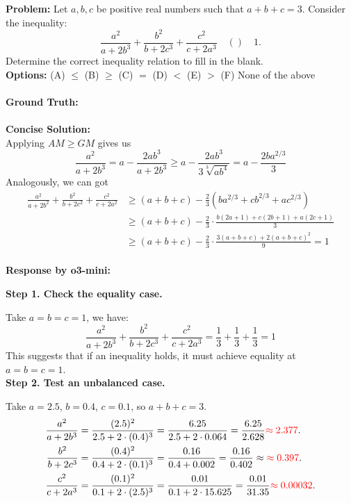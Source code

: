 \begin{examplebox}
\small
\textbf{Problem:} Let $a, b, c$ be positive real numbers such that $a + b + c = 3$. Consider the inequality:
$$
\frac{a^{2}}{a+2 b^{3}}+\frac{b^{2}}{b+2 c^{3}}+\frac{c^{2}}{c+2 a^{3}} \quad () \quad 1 .
$$
Determine the correct inequality relation to fill in the blank.\\
\textbf{Options:} (A) $\leq$ \quad(B) $\geq$ \quad (C) $=$  \quad (D) $<$ \quad  (E) $>$  \quad (F) None of the above
\\\\
\textbf{Ground Truth:} 
\\\\
\textbf{Concise Solution:} \\
Applying $A M \geq G M$ gives us
$$\frac{a^{2}}{a+2 b^{3}}=a-\frac{2 a b^{3}}{a+2 b^{3}} \geq a-\frac{2 a b^{3}}{3 \sqrt[3]{a b^{4}}}=a-\frac{2 b a^{2 / 3}}{3}$$
Analogously, we can got
$$
\begin{aligned}\frac{a^{2}}{a+2 b^{2}}+\frac{b^{2}}{b+2 c^{2}}+\frac{c^{2}}{c+2 a^{2}} &\geq(a+b+c)-\frac{2}{3}\left(b a^{2 / 3}+c b^{2 / 3}+a c^{2 / 3}\right)\\ & \geq(a+b+c)- \frac{2}{3}\cdot\frac{b(2 a+1)+c(2 b+1)+a(2 c+1)}{3}  \\& \geq(a+b+c)- \frac{2}{3}\cdot \frac{3(a+b+c)+2(a+b+c)^{2} }{9}=1\end{aligned}$$
\\
\textbf{Response by o3-mini:}
\vspace{1mm}

\textbf{Step 1. Check the equality case.}

Take $a = b = c = 1$, we have:
\[
\frac{a^{2}}{a+2 b^{3}}+\frac{b^{2}}{b+2 c^{3}}+\frac{c^{2}}{c+2 a^{3}} = \frac{1}{3}+\frac{1}{3}+\frac{1}{3} = 1
\]
This suggests that if an inequality holds, it must achieve equality at $a = b = c = 1$.\\

\textbf{Step 2. Test an unbalanced case.}

Take $a = 2.5$, $b = 0.4$, $c = 0.1$, so $a + b + c = 3$.
\[
\begin{aligned}
  \frac{a^2}{a + 2b^3} &= \frac{(2.5)^2}{2.5 + 2 \cdot (0.4)^3} = \frac{6.25}{2.5 + 2 \cdot 0.064} = \frac{6.25}{2.628} {\textcolor{red}{\approx 2.377}}.\\
  \frac{b^2}{b + 2c^3} &= \frac{(0.4)^2}{0.4 + 2 \cdot (0.1)^3} = \frac{0.16}{0.4 + 0.002} = \frac{0.16}{0.402} \approx {\textcolor{red}{\approx 0.397}}.\\
  \frac{c^2}{c + 2a^3} &= \frac{(0.1)^2}{0.1 + 2 \cdot (2.5)^3} = \frac{0.01}{0.1 + 2 \cdot 15.625} = \frac{0.01}{31.35} {\textcolor{red}{\approx 0.00032}}.\\
\end{aligned}
\]


\end{examplebox}
